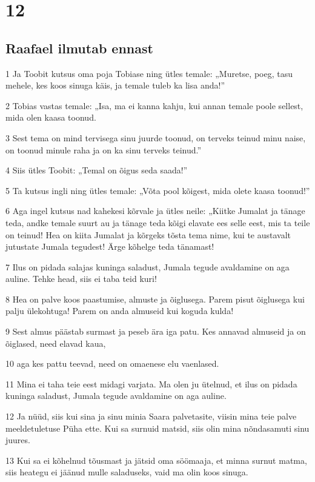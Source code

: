 \chapter{12}

\section*{Raafael ilmutab ennast}

\par 1 Ja Toobit kutsus oma poja Tobiase ning ütles temale: „Muretse,  poeg, tasu mehele, kes koos sinuga käis, ja temale tuleb ka lisa  anda!”
\par 2 Tobias vastas temale: „Isa, ma ei kanna kahju, kui annan temale  poole sellest, mida olen kaasa toonud.
\par 3 Sest tema on mind tervisega sinu juurde toonud, on terveks teinud  minu naise, on toonud minule raha ja on ka sinu terveks teinud.”
\par 4 Siis ütles Toobit: „Temal on õigus seda saada!”
\par 5 Ta kutsus ingli ning ütles temale: „Võta pool kõigest, mida  olete kaasa toonud!”
\par 6 Aga ingel kutsus nad kahekesi kõrvale ja ütles neile: „Kiitke  Jumalat ja tänage teda, andke temale suurt au ja tänage teda kõigi  elavate ees selle eest, mis ta teile on teinud! Hea on kiita Jumalat  ja kõrgeks tõsta tema nime, kui te austavalt jutustate Jumala  tegudest! Ärge kõhelge teda tänamast!
\par 7 Ilus on pidada salajas kuninga saladust, Jumala tegude avaldamine  on aga auline. Tehke head, siis ei taba teid kuri!
\par 8 Hea on palve koos paastumise, almuste ja õiglusega. Parem pisut  õiglusega kui palju ülekohtuga! Parem on anda almuseid kui koguda  kulda!
\par 9 Sest almus päästab surmast ja peseb ära iga patu. Kes annavad  almuseid ja on õiglased, need elavad kaua,
\par 10 aga kes pattu teevad, need on omaenese elu vaenlased.
\par 11 Mina ei taha teie eest midagi varjata. Ma olen ju ütelnud, et  ilus on pidada kuninga saladust, Jumala tegude avaldamine on aga  auline.
\par 12 Ja nüüd, siis kui sina ja sinu minia Saara palvetasite,  viisin mina teie palve meeldetuletuse Püha ette. Kui sa surnuid matsid,  siis olin mina nõndasamuti sinu juures.
\par 13 Kui sa ei kõhelnud tõusmast ja jätsid oma söömaaja, et minna  surnut matma, siis heategu ei jäänud mulle saladuseks, vaid ma olin  koos sinuga.
